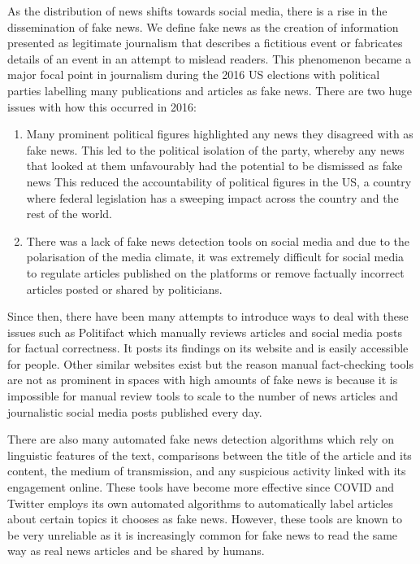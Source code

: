 \documentclass{article}
\begin{document}
\tableofcontents
\cleardoublepage
\pagebreak




As the distribution of news shifts towards social media, there is a rise in the dissemination of fake news. We define fake news as the creation of information presented as legitimate journalism that describes a fictitious event or fabricates details of an event in an attempt to mislead readers. This phenomenon became a major focal point in journalism during the 2016 US elections with political parties labelling many publications and articles as fake news. There are two huge issues with how this occurred in 2016:

\begin{enumerate}
  \item Many prominent political figures highlighted any news they disagreed with as fake news. This led to the political isolation of the party, whereby any news that looked at them unfavourably had the potential to be dismissed as fake news This reduced the accountability of political figures in the US, a country where federal legislation has a sweeping impact across the country and the rest of the world.
  \item There was a lack of fake news detection tools on social media and due to the polarisation of the media climate, it was extremely difficult for social media to regulate articles published on the platforms or remove factually incorrect articles posted or shared by politicians.
\end{enumerate}

Since then, there have been many attempts to introduce ways to deal with these issues such as Politifact which manually reviews articles and social media posts for factual correctness. It posts its findings on its website and is easily accessible for people. Other similar websites exist but the reason manual fact-checking tools are not as prominent in spaces with high amounts of fake news is because it is impossible for manual review tools to scale to the number of news articles and journalistic social media posts published every day.

There are also many automated fake news detection algorithms which rely on linguistic features of the text, comparisons between the title of the article and its content, the medium of transmission, and any suspicious activity linked with its engagement online. These tools have become more effective since COVID and Twitter employs its own automated algorithms to automatically label articles about certain topics it chooses as fake news. However, these tools are known to be very unreliable as it is increasingly common for fake news to read the same way as real news articles and be shared by humans.
\end{document}
